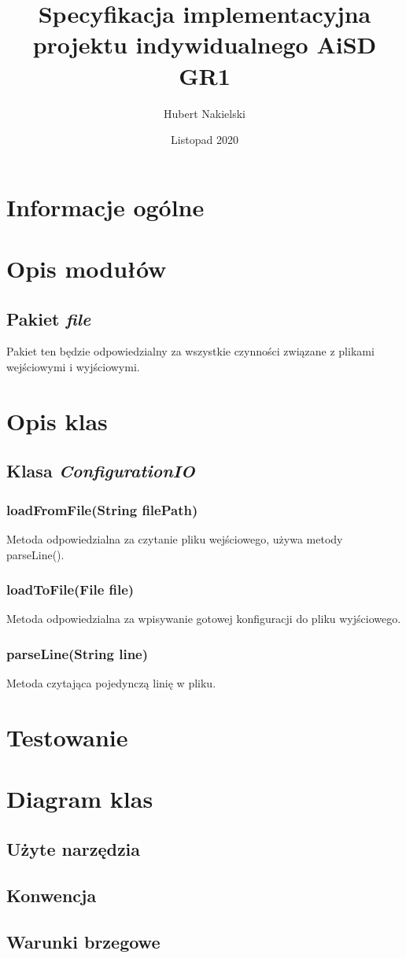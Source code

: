 \documentclass[]{article}
\title{Specyfikacja implementacyjna projektu indywidualnego \textbf{AiSD GR1}}
\author{Hubert Nakielski}
\date{Listopad 2020}
\begin{document}
\maketitle

\section{Informacje ogólne}

\section{Opis modułów}

\subsection{Pakiet \textit{file}}
Pakiet ten będzie odpowiedzialny za wszystkie czynności związane z plikami wejściowymi i wyjściowymi. 

\section{Opis klas }
\subsection{Klasa \textit{ConfigurationIO}}
\subsubsection{loadFromFile(String filePath)}
Metoda odpowiedzialna za czytanie pliku wejściowego, używa metody parseLine().
\subsubsection{loadToFile(File file)}
Metoda odpowiedzialna za wpisywanie gotowej konfiguracji do pliku wyjściowego.
\subsubsection{parseLine(String line)}
Metoda czytająca pojedynczą linię w pliku.

\section{Testowanie}

\section{Diagram klas}

\subsection{Użyte narzędzia}

\subsection{Konwencja}

\subsection{Warunki brzegowe}
\end{document}

